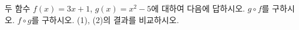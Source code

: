 \hspace*{2mm}\begin{minipage}[t]{\dimexpr\linewidth-2mm\relax}\vspace{0pt}
두 함수 $f(x)=3x+1$, $g(x)=x^2-5$에 대하여 다음에 답하시오.
 $g\circ f$를 구하시오.
 $f\circ g$를 구하시오.
 (1), (2)의 결과를 비교하시오.\end{minipage}
